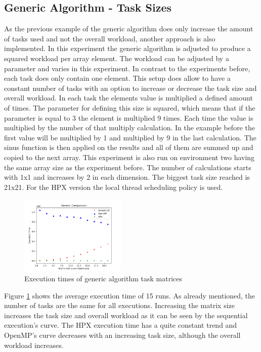 \subsection{Generic Algorithm - Task Sizes}
As the previous example of the generic algorithm does only increase the amount of tasks used and not the overall workload, another approach is also implemented.
In this experiment the generic algorithm is adjusted to produce a squared workload per array element.
The workload can be adjusted by a parameter and varies in this experiment.
In contrast to the experiments before, each task does only contain one element.
This setup does allow to have a constant number of tasks with an option to increase or decrease the task size and overall workload.
In each task the elements value is multiplied a defined amount of times.
The parameter for defining this size is squared, which means that if the parameter is equal to 3 the element is multiplied 9 times.
Each time the value is multiplied by the number of that multiply calculation.
In the example before the first value will be multiplied by 1 and multiplied by 9 in the last calculation.
The sinus function is then applied on the results and all of them are summed up and copied to the next array.
This experiment is also run on environment two having the same array size as the experiment before.
The number of calculations starts with 1x1 and increases by 2 in each dimension.
The biggest task size reached is 21x21.
For the HPX version the local thread scheduling policy is used.
\begin{figure}[h]
	\centering
	\includegraphics[width=0.45\textwidth]{figures/genericMatrix.png}
	\caption{Execution times of generic algorithm task matrices}
	\label{fig:genMatrix}
\end{figure}

Figure \ref{fig:genMatrix} shows the average execution time of 15 runs.
As already mentioned, the number of tasks are the same for all executions.
Increasing the matrix size increases the task size and overall workload as it can be seen by the sequential execution's curve.
The HPX execution time has a quite constant trend and OpenMP's curve decreases with an increasing task size, although the overall workload increases.


